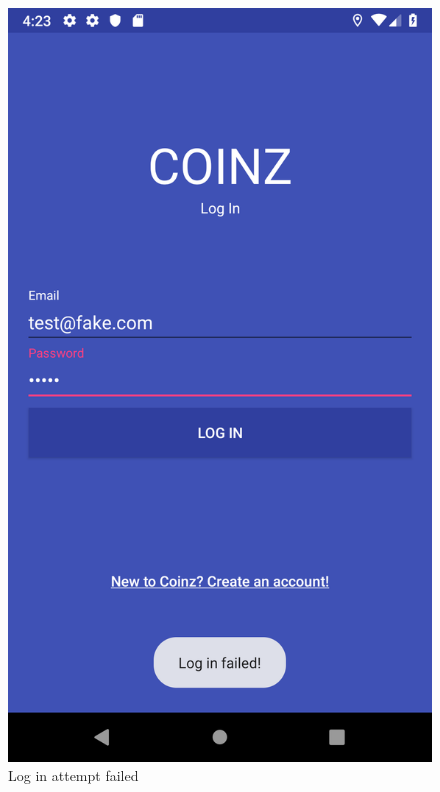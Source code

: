 \documentclass[11pt,a4paper,notitlepage]{article}
\begin{document}
\begin{figure}[H]
    \centering
    \begin{minipage}[t]{0.48\textwidth}
        \includegraphics[scale=0.2]{screenshots/log-in/log-in-failed.png}
        \caption{Log in attempt failed}
    \end{minipage}
    \begin{minipage}[t]{0.48\textwidth}

\end{minipage}
\end{figure}
\end{document}
